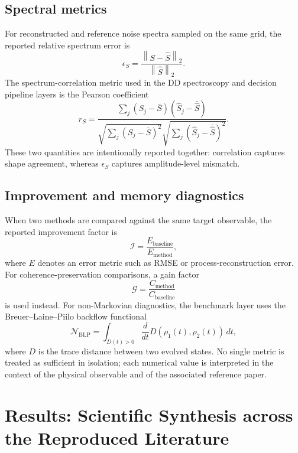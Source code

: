 \documentclass[11pt,a4paper]{article}
\begin{document}
\subsection{Spectral metrics}

For reconstructed and reference noise spectra sampled on the same grid, the
reported relative spectrum error is
\begin{equation}
  \epsilon_{S}
  =
  \frac{\left\|S-\hat{S}\right\|_{2}}{\left\|\hat{S}\right\|_{2}}.
\end{equation}
The spectrum-correlation metric used in the DD spectroscopy and decision
pipeline layers is the Pearson coefficient
\begin{equation}
  r_{S}
  =
  \frac{\sum_j (S_j-\bar{S})(\hat{S}_j-\bar{\hat{S}})}
  {\sqrt{\sum_j (S_j-\bar{S})^2}\sqrt{\sum_j (\hat{S}_j-\bar{\hat{S}})^2}}.
\end{equation}
These two quantities are intentionally reported together: correlation captures
shape agreement, whereas $\epsilon_S$ captures amplitude-level mismatch.

\subsection{Improvement and memory diagnostics}

When two methods are compared against the same target observable, the reported
improvement factor is
\begin{equation}
  \mathcal{I}
  =
  \frac{E_{\mathrm{baseline}}}{E_{\mathrm{method}}},
\end{equation}
where $E$ denotes an error metric such as RMSE or process-reconstruction error.
For coherence-preservation comparisons, a gain factor
\begin{equation}
  \mathcal{G}
  =
  \frac{C_{\mathrm{method}}}{C_{\mathrm{baseline}}}
\end{equation}
is used instead.  For non-Markovian diagnostics, the benchmark layer uses the
Breuer--Laine--Piilo backflow functional
\begin{equation}
  \mathcal{N}_{\mathrm{BLP}}
  =
  \int_{\dot{D}(t)>0}\frac{d}{dt}D\!\left(\rho_1(t),\rho_2(t)\right)\,dt,
\end{equation}
where $D$ is the trace distance between two evolved states.  No single metric is
treated as sufficient in isolation; each numerical value is interpreted in the
context of the physical observable and of the associated reference paper.

\section{Results: Scientific Synthesis across the Reproduced Literature}
\end{document}

